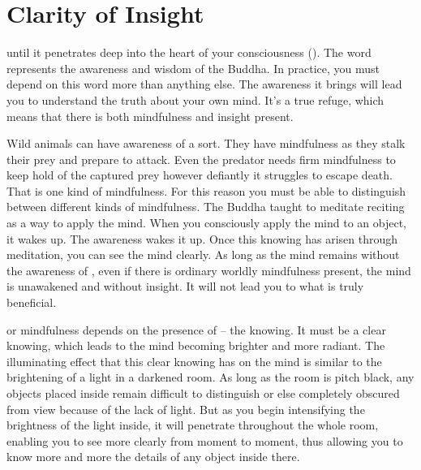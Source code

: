 
\chapter{Clarity of Insight}

\vspace*{0.5\baselineskip}
  until it penetrates deep into the heart of your consciousness (). The word  represents the awareness and wisdom of the Buddha. In practice, you must depend on this word more than anything else. The awareness it brings will lead you to understand the truth about your own mind. It's a true refuge, which means that there is both mindfulness and insight present. 

Wild animals can have awareness of a sort. They have mindfulness as they stalk their prey and prepare to attack. Even the predator needs firm mindfulness to keep hold of the captured prey however defiantly it struggles to escape death. That is one kind of mindfulness. For this reason you must be able to distinguish between different kinds of mindfulness. The Buddha taught to meditate reciting  as a way to apply the mind. When you consciously apply the mind to an object, it wakes up. The awareness wakes it up. Once this knowing has arisen through meditation, you can see the mind clearly. As long as the mind remains without the awareness of , even if there is ordinary worldly mindfulness present, the mind is unawakened and without insight. It will not lead you to what is truly beneficial.

 or mindfulness depends on the presence of  -- the knowing. It must be a clear knowing, which leads to the mind becoming brighter and more radiant. The illuminating effect that this clear knowing has on the mind is similar to the brightening of a light in a darkened room. As long as the room is pitch black, any objects placed inside remain difficult to distinguish or else completely obscured from view because of the lack of light. But as you begin intensifying the brightness of the light inside, it will penetrate throughout the whole room, enabling you to see more clearly from moment to moment, thus allowing you to know more and more the details of any object inside there. 

